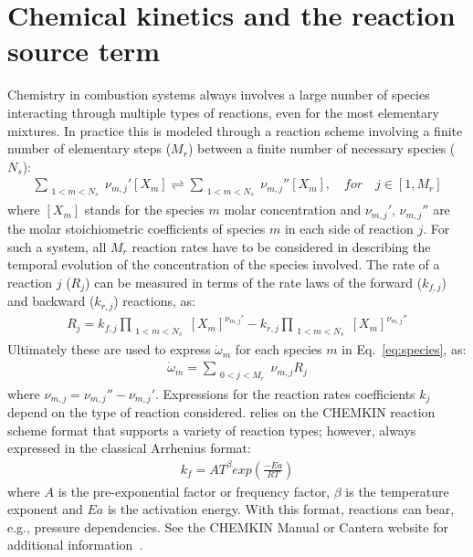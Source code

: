 \section{Chemical kinetics and the reaction source term}
\label{ChemKinetics}
Chemistry in combustion systems always involves a large number of species interacting through multiple types of reactions, even for the most elementary mixtures. In practice this is modeled through a reaction scheme involving a finite number of elementary steps ($M_r$) between a finite number of necessary species ($N_s$):
\begin{eqnarray}
\sum_{\substack{1<m<N_s}} \nu_{m,j}'[X_m] \rightleftharpoons \sum_{\substack{1<m<N_s}} \nu_{m,j}''[X_m],\quad for \quad j \in [1,M_r] 
\label{IntroKM1}
\end{eqnarray}
where $[X_m]$ stands for the species $m$ molar concentration and $\nu_{m,j}'$, $\nu_{m,j}''$ are the molar stoichiometric coefficients of species $m$ in each side of reaction $j$. For such a system, all $M_r$ reaction rates have to be considered in describing the temporal evolution of the concentration of the species involved. The rate of a reaction $j$ ($R_j$) can be measured in terms of the rate laws of the forward ($k_{f,j}$) and backward ($k_{r,j}$) reactions, as:
\begin{eqnarray} 
R_{j} = k_{f,j}\prod_{\substack{1<m<N_s}}  [X_{m}]^{\nu_{m,j}'}-k_{r,j}\prod_{\substack{1<m<N_s}} [X_{m}]^{\nu_{m,j}''}
\end{eqnarray} 
Ultimately these are used to express $ \dot{\omega}_m$ for each species $m$ in Eq.~\ref{eq:species}, as:
\begin{eqnarray}
\dot{\omega}_m = \sum_{\substack{0<j<M_r}} \nu_{m,j} R_j 
\label{IntroKM3}
\end{eqnarray}
where $\nu_{m,j} =\nu_{m,j}'' - \nu_{m,j}'$. Expressions for the reaction rates coefficients $k_j$ depend on the type of reaction considered. \pelelm \; relies on the CHEMKIN reaction scheme format that supports a variety of reaction types; however, always expressed in the classical Arrhenius format:
\begin{eqnarray}
k_f = AT^{\beta} exp \left( \frac{-Ea}{RT}\right)
\end{eqnarray}
where $A$ is the pre-exponential factor or frequency factor, $\beta$ is the temperature exponent and $Ea$ is the activation energy. With this format, reactions can bear, e.g., pressure dependencies. See the CHEMKIN Manual or Cantera website for additional information~\cite{Kee:1989,cantera}.

